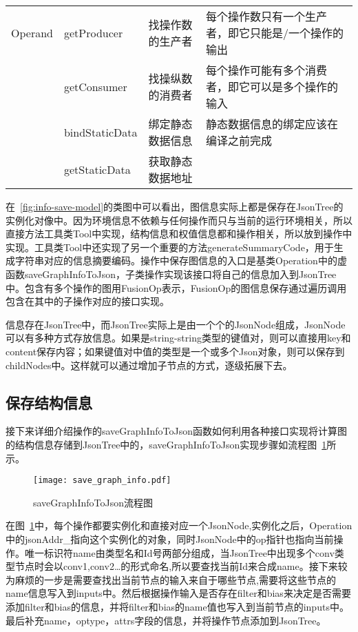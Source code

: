 \begin{table}[htb]
\begin{tabular}{llll}
    \midrule
    Operand    & getProducer  & 找操作数的生产者  &每个操作数只有一个生产者，即它只能是/一个操作的输出 \\
               & getConsumer  & 找操纵数的消费者  &每个操作可能有多个消费者，即它可以是多个操作的输入 \\
               & bindStaticData  & 绑定静态数据信息  & 静态数据信息的绑定应该在编译之前完成\\
               & getStaticData   & 获取静态数据地址  & \\ 
    \bottomrule 
  \end{tabular}
\end{table}

在~\ref{fig:info-save-model}的类图中可以看出，图信息实际上都是保存在JsonTree的实例化对像中。因为环境信息不依赖与任何操作而只与当前的运行环境相关，所以直接方法工具类Tool中实现，结构信息和权值信息都和操作相关，所以放到操作中实现。工具类Tool中还实现了另一个重要的方法generateSummaryCode，用于生成字符串对应的信息摘要编码。操作中保存图信息的入口是基类Operation中的虚函数saveGraphInfoToJson，子类操作实现该接口将自己的信息加入到JsonTree中。包含有多个操作的图用FusionOp表示，FusionOp的图信息保存通过遍历调用包含在其中的子操作对应的接口实现。

信息存在JsonTree中，而JsonTree实际上是由一个个的JsonNode组成，JsonNode可以有多种方式存放信息。如果是string-string类型的键值对，则可以直接用key和content保存内容；如果键值对中值的类型是一个或多个Json对象，则可以保存到childNodes中。这样就可以通过增加子节点的方式，逐级拓展下去。


\subsection {保存结构信息}
接下来详细介绍操作的saveGraphInfoToJson函数如何利用各种接口实现将计算图的结构信息存储到JsonTree中的，saveGraphInfoToJson实现步骤如流程图~\ref{fig:save-graph-info}所示。

\begin{figure}[htb]
  \centering
  \texttt{[image: save\_graph\_info.pdf]}
  \caption{saveGraphInfoToJson流程图}
  \label{fig:save-graph-info}
\end{figure}

在图~\ref{fig:save-graph-info}中，每个操作都要实例化和直接对应一个JsonNode,实例化之后，Operation中的jsonAddr\_指向这个实例化的对象，同时JsonNode中的op指针也指向当前操作。唯一标识符name由类型名和Id号两部分组成，当JsonTree中出现多个conv类型节点时会以conv1,conv2…的形式命名,所以要查找当前Id来合成name。接下来较为麻烦的一步是需要查找出当前节点的输入来自于哪些节点,需要将这些节点的name信息写入到inputs中。然后根据操作输入是否存在filter和bias来决定是否需要添加filter和bias的信息，并将filter和bias的name值也写入到当前节点的inputs中。最后补充name，optype，attrs字段的信息，并将操作节点添加到JsonTree。

